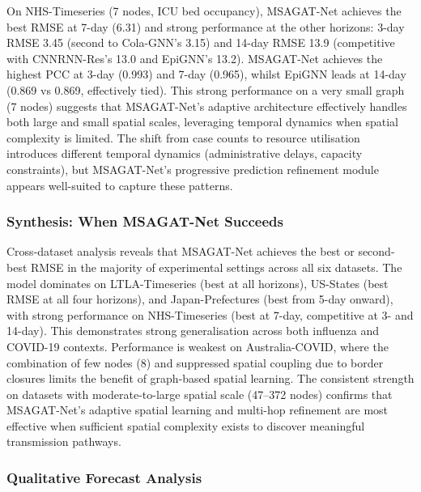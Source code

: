 \documentclass[a4paper,fleqn]{cas-dc}
\begin{document}
On NHS-Timeseries (7 nodes, ICU bed occupancy), MSAGAT-Net achieves the best RMSE at 7-day (6.31) and strong performance at the other horizons: 3-day RMSE 3.45 (second to Cola-GNN's 3.15) and 14-day RMSE 13.9 (competitive with CNNRNN-Res's 13.0 and EpiGNN's 13.2). MSAGAT-Net achieves the highest PCC at 3-day (0.993) and 7-day (0.965), whilst EpiGNN leads at 14-day (0.869 vs 0.869, effectively tied). This strong performance on a very small graph (7 nodes) suggests that MSAGAT-Net's adaptive architecture effectively handles both large and small spatial scales, leveraging temporal dynamics when spatial complexity is limited. The shift from case counts to resource utilisation introduces different temporal dynamics (administrative delays, capacity constraints), but MSAGAT-Net's progressive prediction refinement module appears well-suited to capture these patterns.

\subsubsection{Synthesis: When MSAGAT-Net Succeeds}

Cross-dataset analysis reveals that MSAGAT-Net achieves the best or second-best RMSE in the majority of experimental settings across all six datasets. The model dominates on LTLA-Timeseries (best at all horizons), US-States (best RMSE at all four horizons), and Japan-Prefectures (best from 5-day onward), with strong performance on NHS-Timeseries (best at 7-day, competitive at 3- and 14-day). This demonstrates strong generalisation across both influenza and COVID-19 contexts. Performance is weakest on Australia-COVID, where the combination of few nodes (8) and suppressed spatial coupling due to border closures limits the benefit of graph-based spatial learning. The consistent strength on datasets with moderate-to-large spatial scale (47--372 nodes) confirms that MSAGAT-Net's adaptive spatial learning and multi-hop refinement are most effective when sufficient spatial complexity exists to discover meaningful transmission pathways.

\subsubsection{Qualitative Forecast Analysis}
\end{document}
